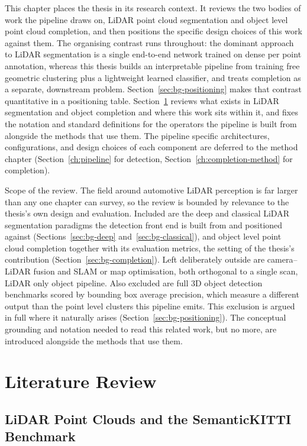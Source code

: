 \documentclass[a4paper,12pt]{report}
\begin{document}
This chapter places the thesis in its research context. It reviews the two bodies of
work the pipeline draws on, LiDAR point cloud segmentation and object level
point cloud completion, and then positions the specific design choices of this
work against them. The organising contrast runs throughout: the dominant approach to
LiDAR segmentation is a single end-to-end network trained on dense per point
annotation, whereas this thesis builds an interpretable pipeline from training free
geometric clustering plus a lightweight learned classifier, and treats completion as a
separate, downstream problem. Section~\ref{sec:bg-positioning} makes that contrast
quantitative in a positioning table. Section~\ref{sec:bg-litreview} reviews what exists in
LiDAR segmentation and object completion and where this work sits within it, and fixes the
notation and standard definitions for the operators the pipeline is built from alongside the
methods that use them. The
pipeline specific architectures, configurations, and design choices of each component are
deferred to the method chapter (Section~\ref{ch:pipeline} for detection,
Section~\ref{ch:completion-method} for completion).

Scope of the review. The field around automotive LiDAR perception is far larger
than any one chapter can survey, so the review is bounded by relevance to the thesis's own
design and evaluation. Included are the deep and classical LiDAR segmentation paradigms the
detection front end is built from and positioned against (Sections~\ref{sec:bg-deep}
and~\ref{sec:bg-classical}), and object level point cloud completion together with its
evaluation metrics, the setting of the thesis's contribution (Section~\ref{sec:bg-completion}).
Left deliberately outside are camera--LiDAR fusion and SLAM or map optimisation, both
orthogonal to a single scan, LiDAR only object pipeline. Also excluded are full 3D object
detection benchmarks scored by bounding box average precision, which measure a different
output than the point level clusters this pipeline emits. This exclusion is argued in full
where it naturally arises (Section~\ref{sec:bg-positioning}). The conceptual grounding and notation needed to
read this related work, but no more, are introduced alongside the methods that use them.

\section{Literature Review}
\label{sec:bg-litreview}

\subsection{LiDAR Point Clouds and the SemanticKITTI Benchmark}
\label{sec:bg-dataset}
\end{document}
